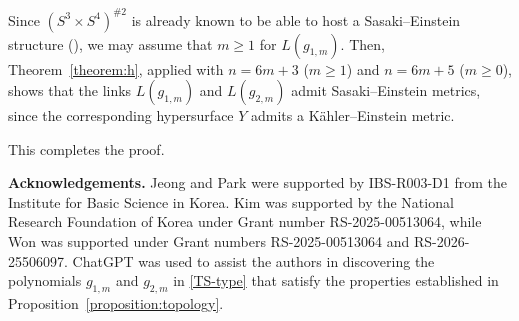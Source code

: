 \documentclass[12pt]{amsart}
\theoremstyle{definition}
\theoremstyle{remark}
\begin{document}
Since $(S^3\times S^4)^{\#2}$ is already known to be able to host a Sasaki--Einstein structure (\cite[Table~2]{CL}), we may assume that $m\geq 1$ for $L(g_{1,m})$. Then, Theorem~\ref{theorem:h}, applied with $n=6m+3$ ($m\geq 1$) and $n=6m+5$ ($m\geq 0$), shows that the links $L(g_{1,m})$ and $L(g_{2,m})$ admit Sasaki--Einstein metrics, since the corresponding hypersurface $Y$ admits a K\"ahler--Einstein metric.

This completes the proof.




\bigskip
\textbf{Acknowledgements.}
Jeong and Park were supported by IBS-R003-D1 from the Institute for Basic Science in Korea. Kim was supported by the National Research Foundation of Korea under Grant number RS-2025-00513064, while Won was supported under Grant numbers RS-2025-00513064 and RS-2026-25506097. ChatGPT was used to assist the authors in discovering the polynomials $g_{1,m}$ and $g_{2,m}$  in \eqref{TS-type} that satisfy the properties established in Proposition~\ref{proposition:topology}.
\medskip
\end{document}
